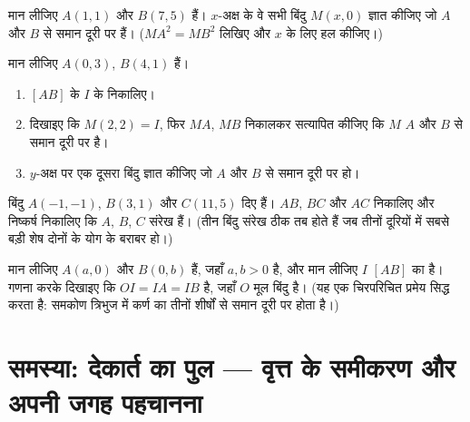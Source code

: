 \begin{exercise}[$\star\star$]\label{exo:g10:coordgeom:7}
मान लीजिए $A(1, 1)$ और $B(7, 5)$ हैं। $x$-अक्ष के वे सभी बिंदु $M(x, 0)$ ज्ञात कीजिए
जो $A$ और $B$ से समान दूरी पर हैं। ($MA^2 = MB^2$ लिखिए और $x$ के लिए हल
कीजिए।)
\end{exercise}

\begin{exercise}[$\star\star$]\label{exo:g10:coordgeom:8}
मान लीजिए $A(0, 3)$, $B(4, 1)$ हैं।
\begin{enumerate}
  \item $[AB]$ के  $I$ के  निकालिए।
  \item दिखाइए कि $M(2, 2) = I$, फिर $MA$, $MB$ निकालकर सत्यापित कीजिए कि $M$
        $A$ और $B$ से समान दूरी पर है।
  \item $y$-अक्ष पर एक दूसरा बिंदु ज्ञात कीजिए जो $A$ और $B$ से समान
        दूरी पर हो।
\end{enumerate}
\end{exercise}

\begin{exercise}[$\star\star$]\label{exo:g10:coordgeom:9}
बिंदु $A(-1, -1)$, $B(3, 1)$ और $C(11, 5)$ दिए हैं। $AB$, $BC$ और $AC$ निकालिए और
निष्कर्ष निकालिए कि $A$, $B$, $C$ संरेख हैं। (तीन बिंदु संरेख ठीक तब
होते हैं जब तीनों दूरियों में सबसे बड़ी शेष दोनों के योग के बराबर हो।)
\end{exercise}

\begin{exercise}[$\star\star\star$]\label{exo:g10:coordgeom:10}
मान लीजिए $A(a, 0)$ और $B(0, b)$ हैं, जहाँ $a, b > 0$ है, और मान लीजिए $I$ $[AB]$ का
 है। गणना करके दिखाइए कि $OI = IA = IB$ है, जहाँ $O$ मूल बिंदु है। (यह
एक चिरपरिचित प्रमेय सिद्ध करता है: समकोण त्रिभुज में कर्ण का 
तीनों शीर्षों से समान दूरी पर होता है।)
\end{exercise}

\section{समस्या: देकार्त का पुल --- वृत्त के समीकरण और अपनी जगह पहचानना}

